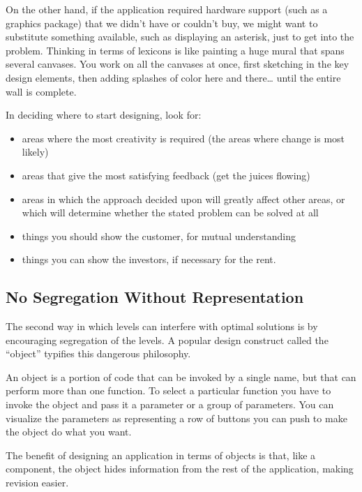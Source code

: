 On the other hand, if the application required hardware support
(such as a graphics package) that we didn't have or couldn't buy, we
might want to substitute something available, such as displaying an
asterisk, just to get into the problem. Thinking in terms of lexicons is like
painting a huge mural that spans several canvases. You work on all the
canvases at once, first sketching in the key design elements, then adding
splashes of color here and there\dots{} until the entire wall is complete.

\begin{tip}
In deciding where to start designing, look for:\medskip

\begin{itemize}
	\item areas where the most creativity is required (the areas
	where change is most likely)
	\item areas that give the most satisfying feedback (get the
	juices flowing)
	\item areas in which the approach decided upon will greatly
	affect other areas, or which will determine whether the stated
	problem can be solved at all
	\item things you should show the customer, for mutual understanding
	\item things you can show the investors, if necessary for the rent.
\end{itemize}
\end{tip}

\subsection{No Segregation Without Representation}%
The second way in which levels can interfere with optimal solutions is by
encouraging segregation of the levels. A popular design construct called
the ``object'' typifies this dangerous philosophy.

An object is a portion of code that can be invoked by a single name,
but that can perform more than one function. To select a particular
function you have to invoke the object and pass it a parameter or a
group of parameters. You can visualize the parameters as representing
a row of buttons you can push to make the object do what you want.

The benefit of designing an application in terms of objects is that,
like a component, the object hides information from the rest of the
application, making revision easier.

